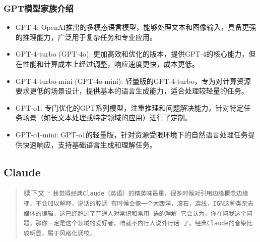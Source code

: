 \subsubsection*{\textsf{GPT}模型家族介绍}
\begin{itemize} 
    \item \textsf{GPT-4}: \textsf{OpenAI}推出的多模态语言模型，能够处理文本和图像输入，具备更强的推理能力，广泛用于复杂任务和专业应用。 
    \item \textsf{GPT-4-turbo (GPT-4o)}: 更加高效和优化的版本，提供\textsf{GPT-4}的核心能力，但在性能和计算成本上经过调整，响应速度更快，成本更低。 
    \item \textsf{GPT-4-turbo-mini (GPT-4o-mini)}: 轻量版的\textsf{GPT-4-turbo}，专为对计算资源要求更低的场景设计，提供基本的语言生成能力，适合处理较轻量的任务。 
    \item \textsf{GPT-o1}: 专门优化的\textsf{GPT}系列模型，注重推理和问题解决能力，针对特定任务场景（如长文本处理或特定领域的应用）进行了定制。 
    \item \textsf{GPT-o1-mini}: \textsf{GPT-o1}的轻量版，针对资源受限环境下的自然语言处理任务提供快速响应，支持基础语言生成和理解任务。 
\end{itemize}

\subsection{\textsf{Claude}}

\begin{quote}{续下文}
    \Huge{“}
    \normalsize \texttt{我觉得经典Claude（英语）的精英味最重，很多时候对引用边缘概念边缘梗，不会加以解释，说话的腔调
    有时候会像一个大西洋，滚石，连线，IGN这种类杂志媒体的编辑，这已经超过了普通人对常识和常用
    语的理解—它会认为，你在问我这个问题，那你一定是这个领域的爱好者，咱就不内行人说外行话
    了。经典Claude的音染比较明显，属于风格化调校。}
    \end{quote}

